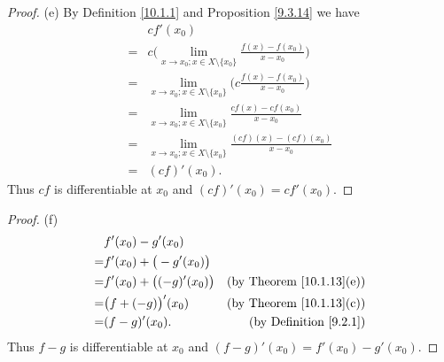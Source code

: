 \begin{proof}{(e)}
    By Definition \ref{10.1.1} and Proposition \ref{9.3.14} we have
    \begin{align*}
          & cf'(x_0)                                                                                 \\
        = & c \bigg(\lim_{x \to x_0 ; x \in X \setminus \{x_0\}} \frac{f(x) - f(x_0)}{x - x_0}\bigg) \\
        = & \lim_{x \to x_0 ; x \in X \setminus \{x_0\}} \bigg(c \frac{f(x) - f(x_0)}{x - x_0}\bigg) \\
        = & \lim_{x \to x_0 ; x \in X \setminus \{x_0\}} \frac{cf(x) - cf(x_0)}{x - x_0}             \\
        = & \lim_{x \to x_0 ; x \in X \setminus \{x_0\}} \frac{(cf)(x) - (cf)(x_0)}{x - x_0}         \\
        = & (cf)'(x_0).
    \end{align*}
    Thus \(cf\) is differentiable at \(x_0\) and \((cf)'(x_0) = cf'(x_0)\).
\end{proof}

\begin{proof}{(f)}
    \begin{align*}
          & f'(x_0) - g'(x_0)                                                     \\
        = & f'(x_0) + \big(-g'(x_0)\big)                                          \\
        = & f'(x_0) + \big((-g)'(x_0)\big) & \text{(by Theorem \ref{10.1.13}(e))} \\
        = & \big(f + (-g)\big)'(x_0)       & \text{(by Theorem \ref{10.1.13}(c))} \\
        = & (f - g)'(x_0).                 & \text{(by Definition \ref{9.2.1})}
    \end{align*}
    Thus \(f - g\) is differentiable at \(x_0\) and \((f - g)'(x_0) = f'(x_0) - g'(x_0)\).
\end{proof}

